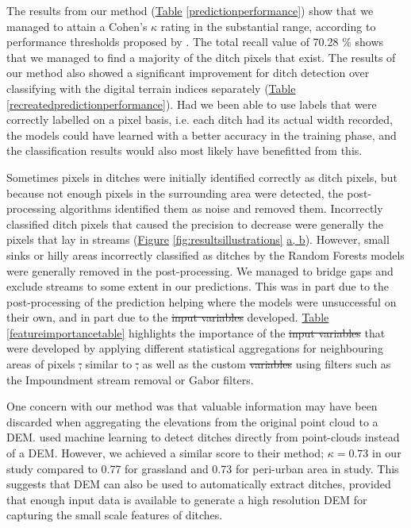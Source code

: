 \documentclass[11pt, review]{elsarticle} %
\providecommand{\DIFaddtex}[1]{{\protect\color{blue}\uwave{#1}}} %
\providecommand{\DIFdeltex}[1]{{\protect\color{red}\sout{#1}}}                      %
\providecommand{\DIFaddbegin}{} %
\providecommand{\DIFaddend}{} %
\providecommand{\DIFdelbegin}{} %
\providecommand{\DIFdelend}{} %
\providecommand{\DIFadd}[1]{\texorpdfstring{\DIFaddtex{#1}}{#1}} %
\providecommand{\DIFdel}[1]{\texorpdfstring{\DIFdeltex{#1}}{}} %
\begin{document}
The results from our method (\hyperref[predictionperformance]{Table} \ref{predictionperformance}) show that we managed to attain a Cohen's $\kappa$ rating in the substantial range, according to performance thresholds proposed by \citet{kappaanalysis}. The total recall value of 70.28 \% shows that we managed to find a majority of the ditch pixels that exist. The results of our method also showed a significant improvement for ditch detection over classifying with the digital terrain indices separately (\hyperref[recreatedpredictionperformance]{Table} \ref{recreatedpredictionperformance}). Had we been able to use labels that were correctly labelled on a pixel basis, i.e. each ditch had its actual width recorded, the models could have learned with a better accuracy in the training phase, and the classification results would also most likely have benefitted from this.

Sometimes pixels in ditches were initially identified correctly as ditch pixels, but because not enough pixels in the surrounding area were detected, the post-processing algorithms identified them as noise and removed them. Incorrectly classified ditch pixels that caused the precision to decrease were generally the pixels that lay in streams (\hyperref[fig:resultsillustrations]{Figure} \ref{fig:resultsillustrations} \hyperref[fig:resultsillustrations]{a, b}). However, small sinks or hilly areas incorrectly classified as ditches by the Random Forests models were generally removed in the post-processing. We managed to bridge gaps and exclude streams to some extent in our predictions. This was in part due to the post-processing of the prediction helping where the models were unsuccessful on their own, and in part due to the \DIFdelbegin \DIFdel{input variables }\DIFdelend \DIFaddbegin \DIFadd{features }\DIFaddend developed. \hyperref[featureimportancetable]{Table} \ref{featureimportancetable} highlights the importance of the \DIFdelbegin \DIFdel{input variables }\DIFdelend \DIFaddbegin \DIFadd{features }\DIFaddend that were developed by applying different statistical aggregations for neighbouring areas of pixels \DIFdelbegin \DIFdel{, }\DIFdelend \DIFaddbegin \DIFadd{(}\DIFaddend similar to \citet{roelens}\DIFdelbegin \DIFdel{, }\DIFdelend \DIFaddbegin \DIFadd{) }\DIFaddend as well as the custom \DIFdelbegin \DIFdel{variables }\DIFdelend \DIFaddbegin \DIFadd{features }\DIFaddend using filters such as the Impoundment stream removal or Gabor filters.

One concern with our method was that valuable information may have been discarded when aggregating the elevations from the original point cloud to a DEM. \citet{roelens} used  machine learning to detect ditches directly from point-clouds instead of a DEM. However, we achieved a similar score to their method; $\kappa=0.73$ in our study compared to 0.77 for grassland and 0.73 for peri-urban area in \citet{roelens} study. This suggests that DEM can also be used to automatically extract ditches, provided that enough input data is available to generate a high resolution DEM for capturing the small scale features of ditches. 
\end{document}
